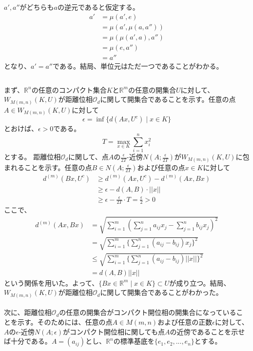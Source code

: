 \documentclass{jsarticle}
\begin{document}
\subsubsection{}
$a',a''$がどちらも$a$の逆元であると仮定する。
\begin{align*}
a'&=\mu(a',e)\\
&=\mu(a',\mu(a,a''))\\
&=\mu(\mu(a',a),a'')\\
&=\mu(e,a'')\\
&=a''
\end{align*}
となり、$a'=a''$である。結局、単位元はただ一つであることがわかる。



\subsection{}
まず、$\mathbb{R}^n$の任意のコンパクト集合$K$と$\mathbb{R}^m$の任意の開集合$U$に対して、$W_{M(m,n)}(K,U)$が距離位相$\mathcal{O}_d$に関して開集合であることを示す。任意の点$A\in W_{M(m,n)}(K,U)$に対して
\[\epsilon=\inf\{d(Ax, U^c)\mid x\in K\}\]
とおけば、$\epsilon>0$である。
\[T=\max_{x\in K}\sum_{i=1}^n x_i^2\]
とする。
距離位相$\mathcal{O}_d$に関して、点$A$の$\frac{\epsilon}{2T}$-近傍$N(A;\frac{\epsilon}{2T})$が$W_{M(m,n)}(K,U)$に包まれることを示す。任意の点$B\in N(A;\frac{\epsilon}{2T})$および任意の点$x\in K$に対して
\begin{align*}
d^{(m)}(Bx,U^c)&\geq d^{(m)}(Ax,U^c)-d^{(m)}(Ax,Bx)\\
&\geq \epsilon - d(A,B)\cdot ||x||\\
&\geq\epsilon-\frac{\epsilon}{2T}\cdot T=\frac{\epsilon}{2}>0
\end{align*}
ここで、
\begin{align*}
d^{(m)}(Ax,Bx)&=\sqrt{\sum_{i=1}^{m}(\sum_{j=1}^{n}a_{ij}x_j-\sum_{j=1}^{n}b_{ij}x_j)^2}\\
&=\sqrt{\sum_{i=1}^{m}\{\sum_{j=1}^{n}(a_{ij}-b_{ij}) x_j\}^2 }\\
&\leq\sqrt{\sum_{i=1}^{m}\{\sum_{j=1}^{n}(a_{ij}-b_{ij}) ||x||\}^2 }\\
&=d(A,B)||x||
\end{align*}
という関係を用いた。よって、$\{Bx\in \mathbb{R}^m\mid x\in K\}\subset U$が成り立つ。結局、$W_{M(m,n)}(K,U)$が距離位相$\mathcal{O}_d$に関して開集合であることがわかった。\\\\
次に、距離位相$\mathcal{O}_d$の任意の開集合がコンパクト開位相の開集合になっていることを示す。そのためには、任意の点$A\in M(m,n)$および任意の正数$\epsilon$に対して、$A$の$\epsilon$-近傍$N(A;\epsilon)$がコンパクト開位相に関しても点$A$の近傍であることを示せば十分である。$A=(a_{ij})$とし、$\mathbb{R}^n$の標準基底を$\{e_1,e_2,...,e_n\}$とする。
\end{document}
